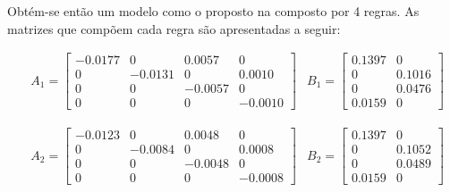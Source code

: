 \begin{table}[!ht]
	\caption{Pontos de Operação da Planta Instalada}
	\label{tabPontOp}
	\small
	\centering
\end{table}

Obtém-se então um modelo como o proposto na   composto por 4 regras. As matrizes que compõem cada regra são apresentadas a seguir:

\begin{align*} %
	& A_1 =
	\begin{bmatrix}
	-0.0177 &     0   &  0.0057   &      0 \\
         0  & -0.0131 &       0   &  0.0010 \\
         0  &       0 &  -0.0057  &      0 \\
         0  &       0 &        0  & -0.0010 
	\end{bmatrix}
	& B_1 =
	\begin{bmatrix}
    0.1397  &      0 \\
		0   & 0.1016 \\
		0   & 0.0476 \\
	0.0159  &      0
	\end{bmatrix}
\end{align*}

\begin{align*} %
	& A_2 =
	\begin{bmatrix}
		-0.0123 &       0 &    0.0048 &        0 \\
			0  & -0.0084 &         0 &   0.0008 \\
			0  &       0 &   -0.0048 &        0 \\
			0  &       0 &         0 &  -0.0008
	\end{bmatrix}
	& B_2 =
	\begin{bmatrix}
		0.1397 &        0 \\
			0  &  0.1052 \\
			0  &  0.0489 \\
		0.0159 &        0
	\end{bmatrix}
\end{align*}

